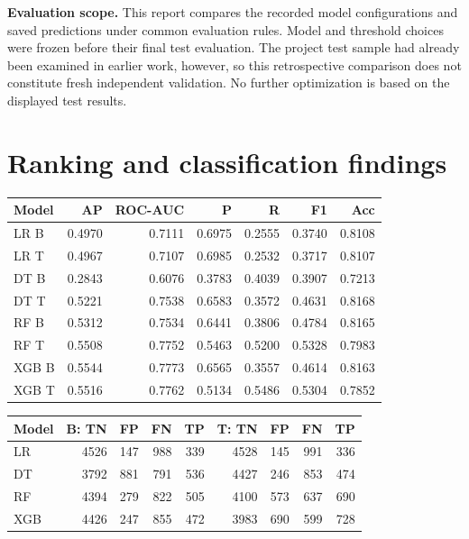 \documentclass{article}
\begin{document}
\textbf{Evaluation scope.} This report compares the recorded model configurations and saved predictions under common evaluation rules. Model and threshold choices were frozen before their final test evaluation. The project test sample had already been examined in earlier work, however, so this retrospective comparison does not constitute fresh independent validation. No further optimization is based on the displayed test results.
\newpage
\section{Ranking and classification findings}
\begin{center}
\begin{minipage}{\linewidth}
\centering
\begin{tabular}{@{}lrrrrrr@{}}\toprule
Model & AP & ROC-AUC & P & R & F1 & Acc\\\midrule
LR B & 0.4970 & 0.7111 & 0.6975 & 0.2555 & 0.3740 & 0.8108\\
LR T & 0.4967 & 0.7107 & 0.6985 & 0.2532 & 0.3717 & 0.8107\\
DT B & 0.2843 & 0.6076 & 0.3783 & 0.4039 & 0.3907 & 0.7213\\
DT T & 0.5221 & 0.7538 & 0.6583 & 0.3572 & 0.4631 & 0.8168\\
RF B & 0.5312 & 0.7534 & 0.6441 & 0.3806 & 0.4784 & 0.8165\\
RF T & 0.5508 & 0.7752 & 0.5463 & 0.5200 & 0.5328 & 0.7983\\
XGB B & 0.5544 & 0.7773 & 0.6565 & 0.3557 & 0.4614 & 0.8163\\
XGB T & 0.5516 & 0.7762 & 0.5134 & 0.5486 & 0.5304 & 0.7852\\
\bottomrule\end{tabular}
\end{minipage}
\end{center}

\begin{center}
\begin{minipage}{\linewidth}
\centering
\begin{tabular}{@{}lrrrrrrrr@{}}\toprule
Model & B: TN & FP & FN & TP & T: TN & FP & FN & TP\\\midrule
LR & 4526 & 147 & 988 & 339 & 4528 & 145 & 991 & 336\\
DT & 3792 & 881 & 791 & 536 & 4427 & 246 & 853 & 474\\
RF & 4394 & 279 & 822 & 505 & 4100 & 573 & 637 & 690\\
XGB & 4426 & 247 & 855 & 472 & 3983 & 690 & 599 & 728\\
\bottomrule\end{tabular}
\end{minipage}
\end{center}
\end{document}

